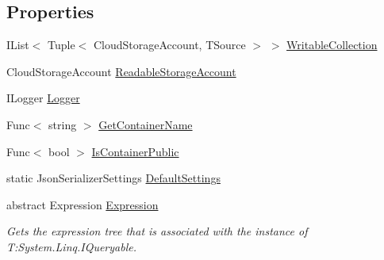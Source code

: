\subsection*{Properties}
\begin{DoxyCompactItemize}
\item 
I\+List$<$ Tuple$<$ Cloud\+Storage\+Account, T\+Source $>$ $>$ \hyperlink{classCqrs_1_1Azure_1_1BlobStorage_1_1StorageStore_aece11e874587ca60913d275079dfc13c_aece11e874587ca60913d275079dfc13c}{Writable\+Collection}
\item 
Cloud\+Storage\+Account \hyperlink{classCqrs_1_1Azure_1_1BlobStorage_1_1StorageStore_af0e0bcba6758fda015f51b07eb464b14_af0e0bcba6758fda015f51b07eb464b14}{Readable\+Storage\+Account}
\item 
I\+Logger \hyperlink{classCqrs_1_1Azure_1_1BlobStorage_1_1StorageStore_acb1c7917bb897f51685d367b035ee119_acb1c7917bb897f51685d367b035ee119}{Logger}
\item 
Func$<$ string $>$ \hyperlink{classCqrs_1_1Azure_1_1BlobStorage_1_1StorageStore_acc1c1e865c9a59772a29cfe44d39e48a_acc1c1e865c9a59772a29cfe44d39e48a}{Get\+Container\+Name}
\item 
Func$<$ bool $>$ \hyperlink{classCqrs_1_1Azure_1_1BlobStorage_1_1StorageStore_a80dc0d2697bbd1e652d5194df8744ae8_a80dc0d2697bbd1e652d5194df8744ae8}{Is\+Container\+Public}
\item 
static Json\+Serializer\+Settings \hyperlink{classCqrs_1_1Azure_1_1BlobStorage_1_1StorageStore_ac5c27123fd0bf4d926a4865e2d6b0bdd_ac5c27123fd0bf4d926a4865e2d6b0bdd}{Default\+Settings}
\item 
abstract Expression \hyperlink{classCqrs_1_1Azure_1_1BlobStorage_1_1StorageStore_a21c204b514718b8af550ce2a627c4b70_a21c204b514718b8af550ce2a627c4b70}{Expression}
\begin{DoxyCompactList}\small\item\em Gets the expression tree that is associated with the instance of T\+:\+System.\+Linq.\+I\+Queryable. \end{DoxyCompactList}\item 

\end{DoxyCompactItemize}
